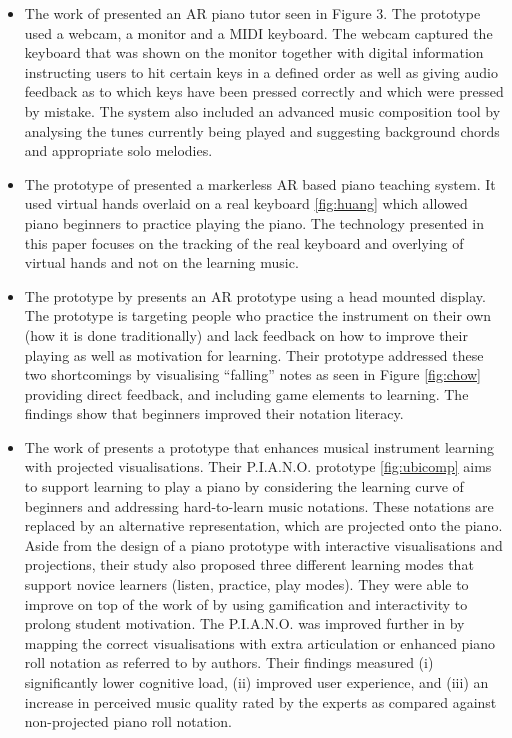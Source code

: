 \documentclass[manuscript,screen]{acmart}
\begin{document}
\begin{itemize}
\item The work of  presented an AR piano tutor seen in Figure 3. The prototype used a webcam, a monitor and a MIDI keyboard. The webcam captured the keyboard that was shown on the monitor together with digital information instructing users to hit certain keys in a defined order as well as giving audio feedback as to which keys have been pressed correctly and which were pressed by mistake. The system also included an advanced music composition tool by analysing the tunes currently being played and suggesting background chords and appropriate solo melodies.\\
\item The prototype of  presented a markerless AR based piano teaching system. It used virtual hands overlaid on a real keyboard \ref{fig:huang} which allowed piano beginners to practice playing the piano. The technology presented in this paper focuses on the tracking of the real keyboard and overlying of virtual hands and not on the learning music.\\
\item The prototype by  presents an AR prototype using a head mounted display. The prototype is targeting people who practice the instrument on their own (how it is done traditionally) and lack feedback on how to improve their playing as well as motivation for learning. Their prototype addressed these two shortcomings by visualising “falling” notes as seen in Figure \ref{fig:chow} providing direct feedback, and including game elements to learning. The findings show that beginners improved their notation literacy.\\
\item The work of  presents a prototype that enhances musical instrument learning with projected visualisations. Their P.I.A.N.O. prototype \ref{fig:ubicomp} aims to support learning to play a piano by considering the learning curve of beginners and addressing hard-to-learn music notations. These notations are replaced by an alternative representation, which are projected onto the piano. Aside from the design of a piano prototype with interactive visualisations and projections, their study also proposed three different learning modes that support novice learners (listen, practice, play modes). They were able to improve on top of the work of  by using gamification and interactivity to prolong student motivation. The P.I.A.N.O. was improved further in  by mapping the correct visualisations with extra articulation or enhanced piano roll notation as referred to by authors. Their findings measured (i) significantly lower cognitive load, (ii)  improved user experience, and (iii) an increase in perceived music quality rated by the experts as compared against non-projected piano roll notation. \\
\end{itemize}
\end{document}
